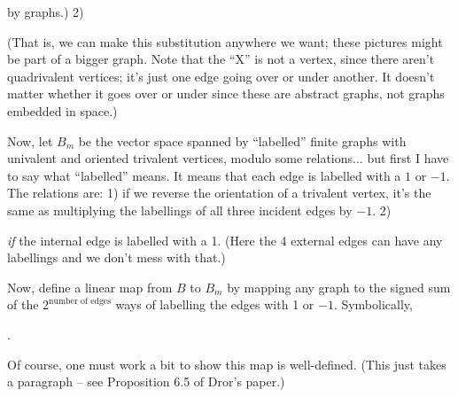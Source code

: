 by graphs.)  2)  
\begin{center}
\quad \raisebox{1cm}{=} \quad
{}
\quad \raisebox{1cm}{$-$} \quad
{}
\end{center}
(That is, we can make this substitution anywhere we want; these pictures
might be part of a bigger graph.  Note that the ``X'' is not a vertex,
since there aren't quadrivalent vertices; it's just one edge going over
or under another.  It doesn't matter whether it goes over or under since
these are abstract graphs, not graphs embedded in space.)  

Now, let $B_m$ be the vector space spanned by ``labelled'' finite graphs
with univalent and oriented trivalent vertices, modulo some relations...
but first I have to say what ``labelled'' means.  It means that each edge
is labelled with a $1$ or $-1$.  The relations are: 1) if we reverse the
orientation of a trivalent vertex, it's the same as multiplying the
labellings of all three incident edges by $-1$.  2)   
\begin{center}
\quad \raisebox{1cm}{=} \quad
{}
\end{center}
\emph{if} the internal edge is labelled with a 1.  (Here the 4 external edges
can have any labellings and we don't mess with that.)

Now, define a linear map from $B$ to $B_m$ by mapping any graph to the
signed sum of the $2^{\text{number of edges}}$ ways of labelling the edges with 1
or $-1$.  Symbolically,
\begin{center}
.
\end{center}
Of course, one must work a bit to show this map is well-defined.  (This
just takes a paragraph -- see Proposition 6.5 of Dror's paper.)  

